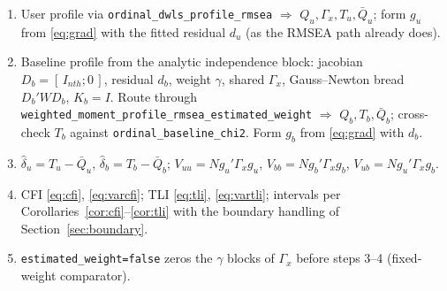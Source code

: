 \documentclass[11pt]{article}
\theoremstyle{plain}
\theoremstyle{remark}
\begin{document}
\begin{enumerate}
\item User profile via \texttt{ordinal\_dwls\_profile\_rmsea} $\Rightarrow$
$Q_u,\Gamma_x,T_u,\bar Q_u$; form $g_u$ from \eqref{eq:grad} with the fitted
residual $d_u$ (as the RMSEA path already does).
\item Baseline profile from the analytic independence block: jacobian
$D_b=[\,I_{nth};0\,]$, residual $d_b$, weight $\gamma$, shared $\Gamma_x$,
Gauss--Newton bread $D_b'WD_b$, $K_b=I$. Route through
\texttt{weighted\_moment\_profile\_rmsea\_estimated\_weight} $\Rightarrow$
$Q_b,T_b,\bar Q_b$; cross-check $T_b$ against \texttt{ordinal\_baseline\_chi2}.
Form $g_b$ from \eqref{eq:grad} with $d_b$.
\item $\hat\delta_u=T_u-\bar Q_u$, $\hat\delta_b=T_b-\bar Q_b$;
$V_{uu}=N g_u'\Gamma_x g_u$, $V_{bb}=N g_b'\Gamma_x g_b$,
$V_{ub}=N g_u'\Gamma_x g_b$.
\item CFI \eqref{eq:cfi}, \eqref{eq:varcfi}; TLI \eqref{eq:tli},
\eqref{eq:vartli}; intervals per Corollaries~\ref{cor:cfi}--\ref{cor:tli} with
the boundary handling of Section~\ref{sec:boundary}.
\item \texttt{estimated\_weight=false} zeros the $\gamma$ blocks of $\Gamma_x$
before steps 3--4 (fixed-weight comparator).
\end{enumerate}
\end{document}
